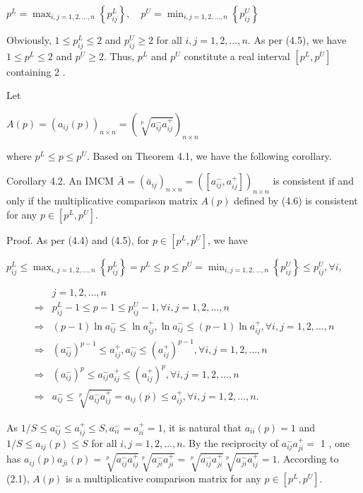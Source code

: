 \documentclass[10pt]{article}
\begin{document}
$p^{L}=\max _{i, j=1,2, \ldots, n}\left\{p_{i j}^{L}\right\}, \quad p^{U}=\min _{i, j=1,2, \ldots, n}\left\{p_{i j}^{U}\right\}$

Obviously, $1 \leq p_{i j}^{L} \leq 2$ and $p_{i j}^{U} \geq 2$ for all $i, j=1,2, \ldots, n$. As per (4.5), we have $1 \leq p^{L} \leq 2$ and $p^{U} \geq 2$. Thus, $p^{L}$ and $p^{U}$ constitute a real interval $\left[p^{L}, p^{U}\right]$ containing 2 .

Let

$A(p)=\left(a_{i j}(p)\right)_{n \times n}=\left(\sqrt[p]{a_{i j}^{-} a_{i j}^{+}}\right)_{n \times n}$

where $p^{L} \leq p \leq p^{U}$. Based on Theorem 4.1, we have the following corollary.

Corollary 4.2. An IMCM $\bar{A}=\left(\bar{a}_{i j}\right)_{n \times n}=\left(\left[a_{i j}^{-}, a_{i j}^{+}\right]\right)_{n \times n}$ is consistent if and only if the multiplicative comparison matrix $A(p)$ defined by (4.6) is consistent for any $p \in\left[p^{L}, p^{U}\right]$.

Proof. As per (4.4) and (4.5), for $p \in\left[p^{L}, p^{U}\right]$, we have

$p_{i j}^{L} \leq \max _{i, j=1,2, \ldots, n}\left\{p_{i j}^{L}\right\}=p^{L} \leq p \leq p^{U}=\min _{i, j=1,2, \ldots, n}\left\{p_{i j}^{U}\right\} \leq p_{i j}^{U}, \forall i$,

$$
\begin{aligned}
& j=1,2, \ldots, n \\
\Rightarrow & p_{i j}^{L}-1 \leq p-1 \leq p_{i j}^{U}-1, \forall i, j=1,2, \ldots, n \\
\Rightarrow & (p-1) \ln a_{i j}^{-} \leq \ln a_{i j}^{+}, \ln a_{i j}^{-} \leq(p-1) \ln a_{i j}^{+}, \forall i, j=1,2, \ldots, n \\
\Rightarrow & \left(a_{i j}^{-}\right)^{p-1} \leq a_{i j}^{+}, a_{i j}^{-} \leq\left(a_{i j}^{+}\right)^{p-1}, \forall i, j=1,2, \ldots, n \\
\Rightarrow & \left(a_{i j}^{-}\right)^{p} \leq a_{i j}^{-} a_{i j}^{+} \leq\left(a_{i j}^{+}\right)^{p}, \forall i, j=1,2, \ldots, n \\
\Rightarrow & a_{i j}^{-} \leq \sqrt[p]{a_{i j}^{-} a_{i j}^{+}}=a_{i j}(p) \leq a_{i j}^{+}, \forall i, j=1,2, \ldots, n .
\end{aligned}
$$

As $1 / S \leq a_{i j}^{-} \leq a_{i j}^{+} \leq S, a_{i i}^{-}=a_{i i}^{+}=1$, it is natural that $a_{i i}(p)=1$ and $1 / S \leq a_{i j}(p) \leq S$ for all $i, j=1,2, \ldots, n$. By the reciprocity of $a_{i j}^{-} a_{j i}^{+}=$ 1 , one has $a_{i j}(p) a_{j i}(p)=\sqrt[p]{a_{i j}^{-} a_{i j}^{+}} \sqrt[p]{a_{j i}^{-} a_{j i}^{+}}=\sqrt[p]{a_{i j}^{-} a_{j i}^{+}} \sqrt[p]{a_{j i}^{-} a_{i j}^{+}}=1$. According to (2.1), $A(p)$ is a multiplicative comparison matrix for any $p \in\left[p^{L}, p^{U}\right]$.
\end{document}
